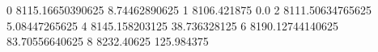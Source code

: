 0 8115.16650390625 8.74462890625
1 8106.421875 0.0
2 8111.50634765625 5.08447265625
4 8145.158203125 38.736328125
6 8190.12744140625 83.70556640625
8 8232.40625 125.984375
